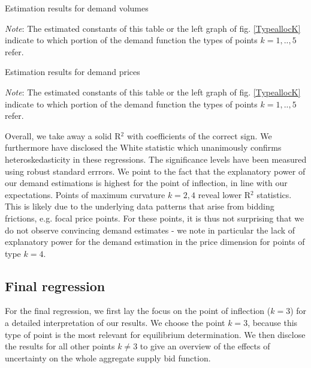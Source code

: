 \begin{table}[!ht]
\vspace{2cm}
\begin{center}

\caption{\label{VolDEPur52} Estimation results for demand volumes}
\end{center}
\emph{Note}: The estimated constants of this table or the left graph of fig. \ref{TypeallocK} indicate to which portion of the demand function the types of points $k=1,..,5$ refer. \\
\end{table}
%
\begin{table}[!ht]
\begin{center}

\caption{\label{PriceDEPur52} Estimation results for demand prices }
\end{center}
\emph{Note}: The estimated constants of this table  or the left graph of fig. \ref{TypeallocK} indicate to which portion of the demand function the types of points $k=1,..,5$ refer. \\
\end{table}
\restoregeometry


Overall, we take away a solid R$^2$ with coefficients of the correct sign. We furthermore have disclosed the White statistic which unanimously confirms heteroskedasticity in these regressions. The significance levels have been measured using robust standard errrors. 
We point to the fact that the explanatory power of our demand estimations is highest for the point of inflection, in line with our expectations. 
Points of maximum curvature $k=2,4$ reveal lower R$^2$ statistics. This is likely due to the underlying data patterns that arise from bidding frictions, e.g. focal price points. For these points, it is thus not surprising that we do not observe convincing demand estimates - we note in particular the lack of explanatory power for the demand estimation in the price dimension for points of type $k=4$. \\



\subsection{Final regression}
\label{discident}
For the final regression, we first lay the focus on the point of inflection ($k=3$) for a detailed interpretation of our results. We choose the point $k=3$, because this type of point is the most relevant for equilibrium determination.
We then disclose the results for all other points $k \neq 3$ to give an overview of the effects of uncertainty on the whole aggregate supply bid function. 

